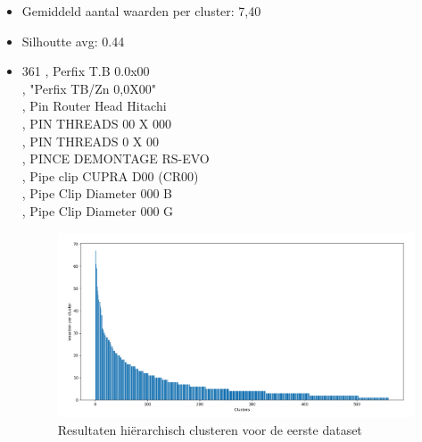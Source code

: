 \begin{enumerate}
\begin{itemize}
    \item Gemiddeld aantal waarden per cluster: 7,40
    \item Silhoutte avg: 0.44
    \item
    361 , Perfix T.B 0.0x00
    \\ , "Perfix TB/Zn 0,0X00"
    \\ , Pin Router Head Hitachi
    \\ , PIN THREADS 00 X 000
    \\ , PIN THREADS 0 X 00
    \\ , PINCE DEMONTAGE RS-EVO
    \\ , Pipe clip CUPRA D00 (CR00)
    \\ , Pipe Clip Diameter 000  B
    \\ , Pipe Clip Diameter 000  G
    \begin{figure}[h]
        \centering
        \includegraphics[width=0.7\linewidth]{../foto's/datalev}
        \caption{Resultaten hiërarchisch clusteren voor de eerste dataset}
        \label{fig:dataset1_hiërarchisch}
    \end{figure}
\end{itemize}
\newpage


\end{enumerate}
